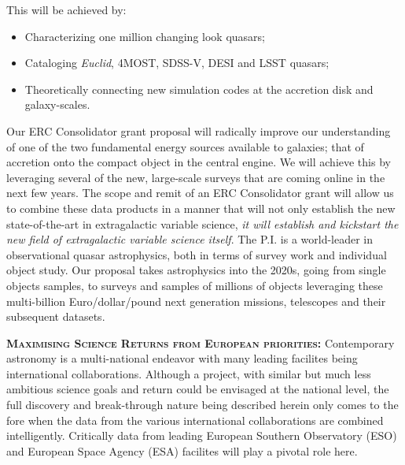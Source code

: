 \smallskip
\smallskip
\noindent
This will be achieved by:
\begin{itemize}
\item Characterizing one million changing look quasars;
\item Cataloging {\it Euclid}, 4MOST, SDSS-V, DESI and LSST quasars; 
\item Theoretically connecting new simulation codes at the accretion disk and galaxy-scales. 
\end{itemize}


\smallskip
\noindent
Our ERC Consolidator grant proposal will radically improve our understanding of 
one of the two fundamental energy sources available to galaxies; that of accretion 
onto the compact object in the central engine. We will achieve this by leveraging 
several of the new, large-scale surveys that are coming online in the next few years. 
The scope and remit of an ERC Consolidator grant will allow us to combine these 
data products in a manner that will 
not only establish the new state-of-the-art in extragalactic variable science, 
{\it it will establish and kickstart the new field of extragalactic variable science itself}. 
The P.I. is a world-leader in observational quasar astrophysics, both in terms of 
survey work and individual object study. 
Our proposal takes astrophysics into the 2020s, going from single objects samples, 
to surveys and samples of millions of objects leveraging these multi-billion Euro/dollar/pound  
next generation missions, telescopes and their subsequent datasets. 


\smallskip
\smallskip
\noindent
\textbf{\textsc{Maximising Science Returns from European priorities:}}
Contemporary astronomy is a multi-national endeavor with many leading
facilites being international collaborations. Although a project, with
similar but much less ambitious science goals and return could be
envisaged at the national level, the full discovery and break-through
nature being described herein only comes to the fore when the data
from the various international collaborations are combined
intelligently.  Critically data from leading European Southern
Observatory (ESO) and European Space Agency (ESA) facilites will play
a pivotal role here.



\smallskip

